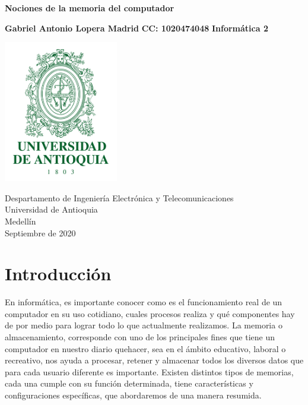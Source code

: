 \documentclass{article}
\begin{document}
\begin{titlepage}
    \begin{center}
        
        
            
        \Huge
        \textbf{Nociones de la memoria del computador}
            
        \vspace{2.4cm}
        \LARGE
            
        \vspace{1.0cm}
        \LARGE
        \centering
        \textbf{Gabriel Antonio Lopera Madrid}\break
        \vspace{2cm}
        \LARGE
        \textbf{CC: 1020474048}\break
        \vspace{4cm}
        \LARGE
        \textbf{Informática 2}\break
        \vspace{1cm}
        \centering
       
        \includegraphics[width=5cm]{udea.png} 
        
        \Large
        Despartamento de Ingeniería Electrónica y Telecomunicaciones\\
        Universidad de Antioquia\\
        Medellín\\
        Septiembre de 2020
            
    \end{center}
\end{titlepage}

\tableofcontents

\section{Introducción}
En informática, es importante conocer como es el funcionamiento real de un computador en su uso cotidiano, cuales procesos realiza y qué componentes hay de por medio para lograr todo lo que actualmente realizamos. La memoria o almacenamiento, corresponde con uno de los principales fines que tiene un computador en nuestro diario quehacer, sea en el ámbito educativo, laboral o recreativo, nos ayuda a procesar, retener y almacenar todos los diversos datos que para cada usuario diferente es importante. Existen distintos tipos de memorias, cada una cumple con su función determinada, tiene características y configuraciones específicas, que abordaremos de una manera resumida.
\end{document}
